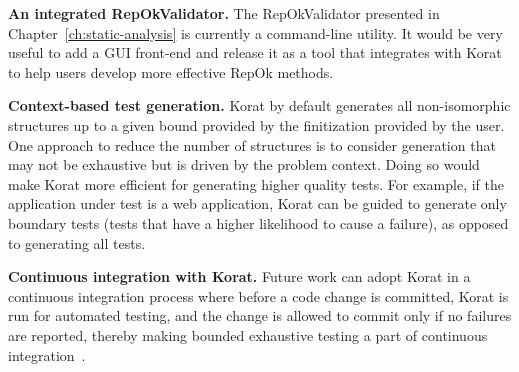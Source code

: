 \para \textbf{An integrated RepOkValidator.} The RepOkValidator
presented in Chapter~\ref{ch:static-analysis} is currently a
command-line utility.  It would be very useful to add a GUI front-end
and release it as a tool that integrates with Korat to help users
develop more effective RepOk methods.

\begin{comment}
\para \textbf{Reflection instrumentation.}
Chapter~\ref{ch:adding-reflection} presented our technique that builds
on Korat to support the usage of reflection; however, our current
protoype tool implementation requires manually transforming the calls
to Java reflection API to our own reflection API (which mimics the
Java reflection API but also notifies Korat of field accesses).  An
additional simple engineering step that replaces calls to Java
reflection API to our API is required for fully automatic support of
allowing the use of reflection for field accesses.
\end{comment}

\para \textbf{Context-based test generation.} Korat by default
generates all non-isomorphic structures up to a given bound provided
by the finitization provided by the user. One approach to reduce the
number of structures is to consider generation that may not be
exhaustive but is driven by the problem context. Doing so would make
Korat more efficient for generating higher quality tests. For example,
if the application under test is a web application, Korat can be
guided to generate only boundary tests (tests that have a higher
likelihood to cause a failure), as opposed to generating all tests.

\para \textbf{Continuous integration with Korat.} Future work can
adopt Korat in a continuous integration process where before a code
change is committed, Korat is run for automated testing, and the
change is allowed to commit only if no failures are reported, thereby
making bounded exhaustive testing a part of continuous
integration~\cite{fowler2006continuous}.

